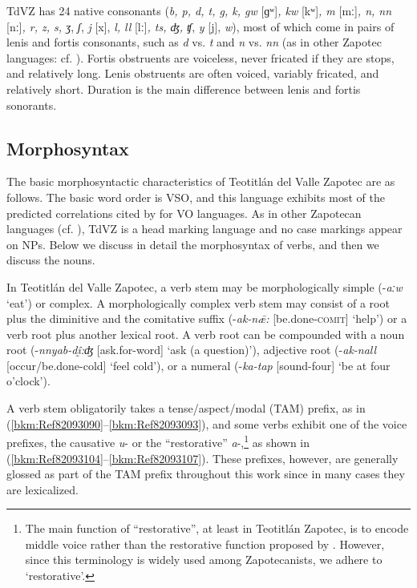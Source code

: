 \documentclass[output=paper]{langscibook}
\begin{document}
TdVZ has 24 native consonants (\textit{b, p, d, t, g, k, gw} [ɡʷ]\textit{, kw} [kʷ]\textit{, m} [mː]\textit{, n, nn} [nː]\textit{, r, z, s, ʒ}, \textit{ʃ}, \textit{j} [x], \textit{l, ll} [lː]\textit{, ts, ʤ, ʧ}, \textit{y} [j], \textit{w}), most of which come in pairs of lenis and fortis consonants, such as \textit{d} vs. \textit{t} and \textit{n} vs. \textit{nn} (as in other Zapotec languages: cf. \citealt{Nellis1980}). Fortis obstruents are voiceless, never fricated if they are stops, and relatively long. Lenis obstruents are often voiced, variably fricated, and relatively short. Duration is the main difference between lenis and fortis sonorants.


\subsection{Morphosyntax} 
\label{sec:key:2.2}

The basic morphosyntactic characteristics of Teotitlán del Valle Zapotec are as follows. The basic word order is VSO, and this language exhibits most of the predicted correlations cited by \citet{Dryer1992} for VO languages. As in other Zapotecan languages (cf. \citealt{Lee1999}), TdVZ is a head marking language and no case markings appear on NPs. Below we discuss in detail the morphosyntax of verbs, and then we discuss the nouns.

In Teotitlán del Valle Zapotec, a verb stem may be morphologically simple (-\textit{aːw} `eat') or complex. A morphologically complex verb stem may consist of a root plus the diminitive and the comitative suffix (-\textit{ak-nǣ:} [be.done-\textsc{comit}] `help') or a verb root plus another lexical root. A verb root can be compounded with a noun root (-\textit{nnyab-dḭ̂:ʤ} [ask.for-word] `ask (a question)'), adjective root (-\textit{ak-nall} [occur/be.done-cold] `feel cold'), or a numeral (-\textit{ka-tap} [sound-four] `be at four o'clock'). 

A verb stem obligatorily takes a tense/aspect/modal (TAM) prefix, as in (\ref{bkm:Ref82093090}--\ref{bkm:Ref82093093}), and some verbs exhibit one of the voice prefixes, the causative \textit{u}- or the ``restorative'' \textit{a}-,\footnote{The main function of ``restorative'', at least in Teotitlán Zapotec, is to encode middle voice rather than the restorative function proposed by \citet{Smith-Stark2002}. However, since this terminology is widely used among Zapotecanists, we adhere to `restorative'.} as shown in (\ref{bkm:Ref82093104}--\ref{bkm:Ref82093107}). These prefixes, however, are generally glossed as part of the TAM prefix throughout this work since in many cases they are lexicalized.
\end{document}
